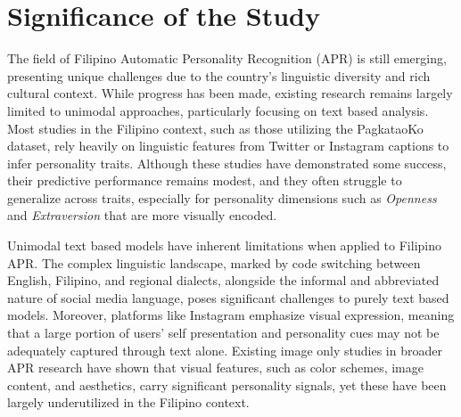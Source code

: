 



\section{Significance of the Study}
\label{sec: Significance}

The field of Filipino Automatic Personality Recognition (APR) is still emerging, presenting unique challenges due to the country’s linguistic diversity and rich cultural context. While progress has been made, existing research remains largely limited to unimodal approaches, particularly focusing on text based analysis. Most studies in the Filipino context, such as those utilizing the PagkataoKo dataset, rely heavily on linguistic features from Twitter or Instagram captions to infer personality traits. Although these studies have demonstrated some success, their predictive performance remains modest, and they often struggle to generalize across traits, especially for personality dimensions such as \textit{Openness} and \textit{Extraversion} that are more visually encoded.

Unimodal text based models have inherent limitations when applied to Filipino APR. The complex linguistic landscape, marked by code switching between English, Filipino, and regional dialects, alongside the informal and abbreviated nature of social media language, poses significant challenges to purely text based models. Moreover, platforms like Instagram emphasize visual expression, meaning that a large portion of users' self presentation and personality cues may not be adequately captured through text alone. Existing image only studies in broader APR research have shown that visual features, such as color schemes, image content, and aesthetics, carry significant personality signals, yet these have been largely underutilized in the Filipino context.

